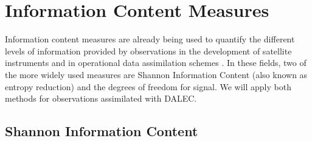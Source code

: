 \documentclass[11pt]{article}
\begin{document}
\section{Information Content Measures}%

Information content measures are already being used to quantify the different levels of information provided by observations in the development of satellite instruments \cite{stewart2008correlated, engelen2004information} and in operational data assimilation schemes \cite{fisher2003estimation, sandu2012practical}. In these fields, two of the more widely used measures are Shannon Information Content (also known as entropy reduction) and the degrees of freedom for signal. We will apply both methods for observations assimilated with DALEC. 

\subsection{Shannon Information Content}%
\end{document}
